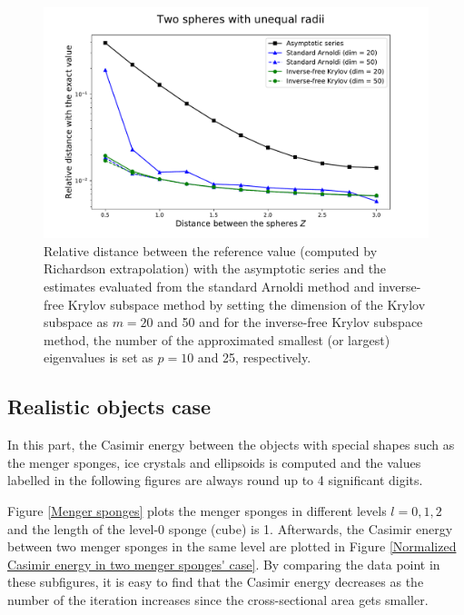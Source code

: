 \begin{figure}[H]
    \includegraphics[scale = 0.7]{figures/relative_distance_unequal_radii.pdf}
    \caption{Relative distance between the reference value (computed by Richardson extrapolation) with the asymptotic series and the estimates evaluated from 
    the standard Arnoldi method and inverse-free Krylov subspace method by setting the dimension of the Krylov subspace as $m = 20$ and 50 and for the inverse-free
    Krylov subspace method, the number of the approximated smallest (or largest) eigenvalues is set as $p = 10$ and 25, respectively.}
    \label{unequal_radii_rel_dist}
\end{figure}

\subsection{Realistic objects case}
In this part, the Casimir energy between the objects with special shapes such as the menger sponges, ice crystals and ellipsoids is computed and 
the values labelled in the following figures are always round up to 4 significant digits. 

Figure \ref{Menger sponges} plots the menger sponges in different levels $l = 0, 1, 2$ and the length of the level-0 sponge (cube) is 1. Afterwards, the Casimir 
energy between two menger sponges in the same level are plotted in Figure \ref{Normalized Casimir energy in two menger sponges' case}. By comparing the data 
point in these subfigures, it is easy to find that the Casimir energy decreases as the number of the iteration increases since the cross-sectional 
area gets smaller.


